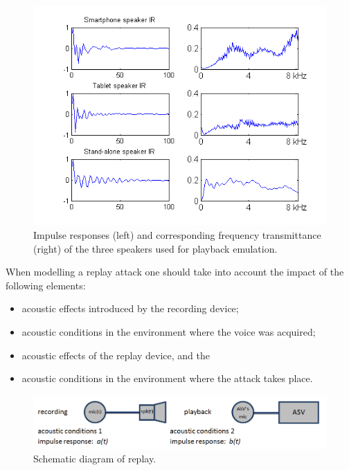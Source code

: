 


\begin{figure}
	\centering
	\includegraphics[width=1\linewidth]{Figs/IRs.png}
	\caption{Impulse responses (left) and corresponding frequency transmittance (right) of the three speakers used for playback emulation.}
	\label{fig::IRs}
\end{figure}

When modelling a replay attack one should take into account the impact of the following elements:

\begin{itemize}
\item acoustic effects introduced by the recording device;
\item acoustic conditions in the environment where the voice was acquired;
\item acoustic effects of the replay device, and the
\item acoustic conditions in the environment where the attack takes place. 
\end{itemize}

\begin{figure}
	\includegraphics[width=1\linewidth]{Figs/replay.png}

	\caption{Schematic diagram of replay.}
	\label{fig::Replay}
\end{figure}



